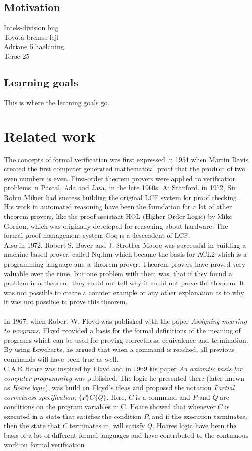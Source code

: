 \documentclass[a4paper]{report}
\begin{document}
\section{Motivation}
Intels-division bug \\
Toyota bremse-fejl\\
Adriane 5 haeldning\\
Terac-25\\
\section{Learning goals}
This is where the learning goals go.
\chapter{Related work}
The concepts of formal verification was first expressed in 1954 when Martin Davis created the first computer generated mathematical proof that the product of two even numbers is even. First-order theorem provers were applied to verification problems in Pascal, Ada and Java, in the late 1960s. 
At Stanford, in 1972, Sir Robin Milner had success building the original LCF system for proof checking. His work in automated reasoning have been the foundation for a lot of other theorem provers, like the proof assistant HOL (Higher Order Logic) by Mike Gordon, which was originally developed for reasoning about hardware. The formal proof management system Coq is a descendent of LCF. \\
Also in 1972, Robert S. Boyer and J. Strother Moore was successful in building a machine-based prover, called Nqthm which became the basis for ACL2 which is a programming language and a theorem prover. Theorem provers have proved very valuable over the time, but one problem with them was, that if they found a problem in a theorem, they could not tell why it could not prove the theorem. It was not possible to create a counter example or any other explanation as to why it was not possible to prove this theorem. \\\\
In 1967, when Robert W. Floyd was published with the paper \textit{Assigning meaning to programs}\cite{Floyd1967}. Floyd provided a basis for the formal definitions of the meaning of programs which can be used for proving correctness, equivalence and termination. By using flowcharts, he argued that when a command is reached, all previous commands will have been true as well.\\ C.A.R Hoare was inspired by Floyd and in 1969 his paper \textit{An axiomtic basis for computer programming}\cite{Hoare1969} was published. The logic he presented there (later known as \textit{Hoare logic}), was build on Floyd's ideas and proposed the notation \textit{Partial correctness specification}; $\{P\} C \{Q\}$. Here, $C$ is a command and $P$ and $Q$ are conditions on the program variables in C. Hoare showed that whenever $C$ is executed in a state that satisfies the condition $P$, and if the execution terminates, then the state that $C$ terminates in, will satisfy $Q$. Hoares logic have been the basis of a lot of different formal languages and have contributed to the continuous work on formal verification. \\
\end{document}
